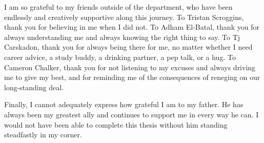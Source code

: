 \documentclass[masters]{ucbthesis}
\begin{document}
\begin{frontmatter}
\begin{acknowledgements}
 I am so grateful to my friends outside of the department, who have been 
 endlessly and creatively supportive along this journey. To Tristan Scroggins, 
 thank you for believing in me when I did not. To Adham El-Batal, thank you for 
 always understanding me and always knowing the right thing to say. To Tj 
 Carskadon, thank you for always being there for me, no matter whether I need 
 career advice, a study buddy, a drinking partner, a pep talk, or a hug.  To 
 Cameron Chalker, thank you for not listening to my excuses and always driving 
 me to give my best, and for reminding me of the consequences of reneging on 
 our long-standing deal.

 Finally, I cannot adequately express how grateful I am to my father. He has 
 always been my greatest ally and continues to support me in every way he can. 
 I would not have been able to complete this thesis without him standing 
 steadfastly in my corner.

\end{acknowledgements}

\end{frontmatter}

\pagestyle{headings}








\appendix


{}


\end{document}
